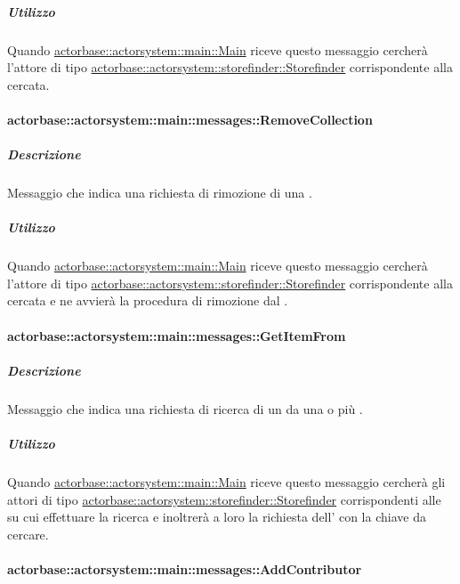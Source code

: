 \documentclass{scalatekids-article}
\begin{document}
\subparagraph{Utilizzo}

Quando \hyperref[sec:actorbase::actorsystem::main::Main]{actorbase::actorsystem::main::Main}
riceve questo messaggio cercherà l'attore di tipo
\hyperref[sec:actorbase::actorsystem::storefinder::Storefinder]{actorbase::actorsystem::\allowbreak{}storefinder::\allowbreak{}Storefinder}
corrispondente alla  cercata.

\paragraph{actorbase::actorsystem::main::messages::RemoveCollection}
\label{sec:actorbase::actorsystem::main::messages::RemoveCollection}

\subparagraph{Descrizione}

Messaggio che indica una richiesta di rimozione di una .

\subparagraph{Utilizzo}

Quando \hyperref[sec:actorbase::actorsystem::main::Main]{actorbase::actorsystem::main::Main}
riceve questo messaggio cercherà l'attore di tipo
\hyperref[sec:actorbase::actorsystem::storefinder::Storefinder]{actorbase::actorsystem::\allowbreak{}storefinder::\allowbreak{}Storefinder}
corrispondente alla  cercata e ne avvierà
la procedura di rimozione dal .

\paragraph{actorbase::actorsystem::main::messages::GetItemFrom}
\label{sec:actorbase::actorsystem::main::messages::GetItemFrom}

\subparagraph{Descrizione}

Messaggio che indica una richiesta di ricerca di un  da una o più .

\subparagraph{Utilizzo}

Quando \hyperref[sec:actorbase::actorsystem::main::Main]{actorbase::actorsystem::main::Main}
riceve questo messaggio cercherà gli attori di tipo
\hyperref[sec:actorbase::actorsystem::storefinder::Storefinder]{actorbase::actorsystem::\allowbreak{}storefinder::\allowbreak{}Storefinder}
corrispondenti alle  su cui effettuare la ricerca
e inoltrerà a loro la richiesta dell' con la chiave da cercare.

\paragraph{actorbase::actorsystem::main::messages::AddContributor}
\label{sec:actorbase::actorsystem::main::messages::AddContributor}
\end{document}

